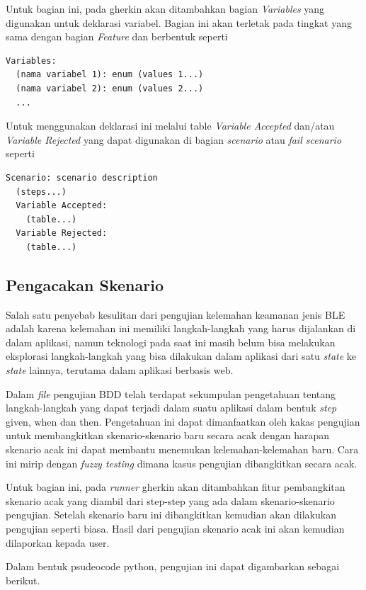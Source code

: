 Untuk bagian ini, pada gherkin akan ditambahkan bagian \emph{Variables} yang digunakan
untuk deklarasi variabel. Bagian ini akan terletak pada tingkat yang sama dengan bagian \emph{Feature}
dan berbentuk seperti

\begin{lstlisting}[language=gherkin]
Variables:
  (nama variabel 1): enum (values 1...)
  (nama variabel 2): enum (values 2...)
  ...
\end{lstlisting}

Untuk menggunakan deklarasi ini melalui table \emph{Variable Accepted} dan/atau \emph{Variable Rejected}
yang dapat digunakan di bagian \emph{scenario} atau \emph{fail scenario} seperti

\begin{lstlisting}[language=gherkin]
Scenario: scenario description
  (steps...)
  Variable Accepted:
    (table...)
  Variable Rejected:
    (table...)
\end{lstlisting}

\subsection{Pengacakan Skenario}
\label{sec:323}

Salah satu penyebab kesulitan dari pengujian kelemahan keamanan jenis BLE adalah karena kelemahan
ini memiliki langkah-langkah yang harus dijalankan di dalam aplikasi, namun teknologi pada saat
ini masih belum bisa melakukan eksplorasi langkah-langkah yang bisa dilakukan dalam aplikasi
dari satu \emph{state} ke \emph{state} lainnya, terutama dalam aplikasi berbasis web.

Dalam \emph{file} pengujian BDD telah terdapat sekumpulan pengetahuan tentang langkah-langkah
yang dapat terjadi dalam suatu aplikasi dalam bentuk \emph{step} given, when dan then.
Pengetahuan ini dapat dimanfaatkan oleh kakas pengujian untuk membangkitkan skenario-skenario
baru secara acak dengan harapan skenario acak ini dapat membantu menemukan kelemahan-kelemahan baru.
Cara ini mirip dengan \emph{fuzzy testing} dimana kasus pengujian dibangkitkan secara acak.

Untuk bagian ini, pada \textit{runner} gherkin akan ditambahkan fitur pembangkitan skenario acak
yang diambil dari step-step yang ada dalam skenario-skenario pengujian. Setelah skenario baru ini
dibangkitkan kemudian akan dilakukan pengujian seperti biasa. Hasil dari pengujian skenario acak
ini akan kemudian dilaporkan kepada user.

Dalam bentuk psudeocode python, pengujian ini dapat digambarkan sebagai berikut.


